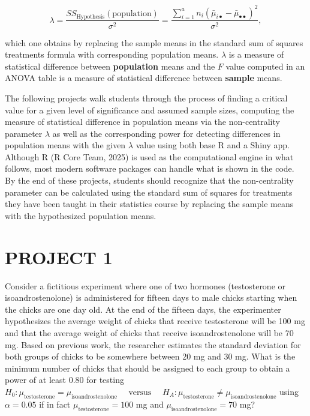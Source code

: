 \documentclass[
]{article}
\begin{document}
\begin{equation*}
\lambda = \frac{SS_\text{Hypothesis}(\text{population})}{\sigma^2} = \frac{\sum_{i=1}^{a}n_i(\bar{\mu}_{i\bullet} - \bar{\mu}_{\bullet\bullet})^2}{\sigma^2},
\end{equation*}

which one obtains by replacing the sample means in the standard sum of squares treatments formula with corresponding population means. \(\lambda\) is a measure of statistical difference between \textbf{population} means and the \(F\) value computed in an ANOVA table is a measure of statistical difference between \textbf{sample} means.

The following projects walk students through the process of finding a critical value for a given level of significance and assumed sample sizes, computing the measure of statistical difference in population means via the non-centrality parameter \(\lambda\) as well as the corresponding power for detecting differences in population means with the given \(\lambda\) value using both base R and a Shiny app. Although R (R Core Team, 2025) is used as the computational engine in what follows, most modern software packages can handle what is shown in the code. By the end of these projects, students should recognize that the non-centrality parameter can be calculated using the standard sum of squares for treatments they have been taught in their statistics course by replacing the sample means with the hypothesized population means.

\hypertarget{project-1}{%
\section*{PROJECT 1}\label{project-1}}

Consider a fictitious experiment where one of two hormones (testosterone or isoandrostenolone) is administered for fifteen days to male chicks starting when the chicks are one day old. At the end of the fifteen days, the experimenter hypothesizes the average weight of chicks that receive testosterone will be 100 mg and that the average weight of chicks that receive isoandrostenolone will be 70 mg. Based on previous work, the researcher estimates the standard deviation for both groups of chicks to be somewhere between 20 mg and 30 mg. What is the minimum number of chicks that should be assigned to each group to obtain a power of at least 0.80 for testing \(H_0: \mu_\text{testosterone} = \mu_\text{isoandrostenolone}\quad\text{ versus }\quad H_A: \mu_\text{testosterone} \neq \mu_\text{isoandrostenolone}\) using \(\alpha = 0.05\) if in fact \(\mu_\text{testosterone} = 100\) mg and \(\mu_\text{isoandrostenolone} = 70\) mg?
\end{document}
